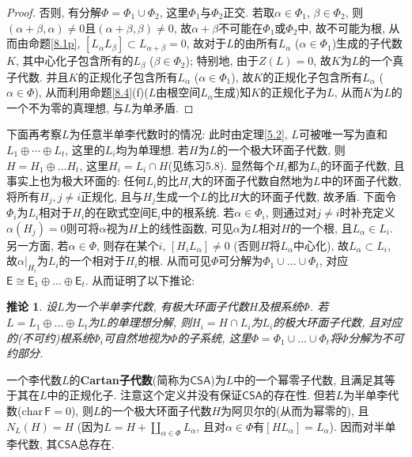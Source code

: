 \documentclass{ctexart}%
\newtheorem{corollary}{推论}
\theoremstyle{definition}
\theoremstyle{remark}
\begin{document}
\begin{proof}否则, 有分解$\Phi=\Phi_1\cup \Phi_2$, 这里$\Phi_1$与$\Phi_2$正交. 若取$\alpha\in\Phi_1$, $\beta\in\Phi_2$, 则$(\alpha+\beta,\alpha)\neq 0$且$(\alpha+\beta,\beta)\neq 0$, 故$\alpha+\beta$不可能在$\Phi_1$或$\Phi_2$中, 故不可能为根, 从而由命题\ref{8.1p}, $[L_\alpha L_\beta]\subset L_{\alpha+\beta}=0$, 故对于$L$的由所有$L_\alpha$ ($\alpha\in \Phi_1$)生成的子代数$K$, 其中心化子包含所有的$L_\beta$ ($\beta\in\Phi_2$); 特别地, 由于$Z(L)=0$, 故$K$为$L$的一个真子代数. 并且$K$的正规化子包含所有$L_\alpha$ ($\alpha\in \Phi_1$), 故$K$的正规化子包含所有$L_\alpha$ ($\alpha\in \Phi$), 从而利用命题\ref{8.4}(f)($L$由根空间$L_\alpha$生成)知$K$的正规化子为$L$, 从而$K$为$L$的一个不为零的真理想, 与$L$为单矛盾.
\end{proof}

下面再考察$L$为任意半单李代数时的情况: 此时由定理\ref{5.2}, $L$可被唯一写为直和$L_1\oplus\cdots \oplus L_t$, 这里的$L_i$均为单理想. 若$H$为$L$的一个极大环面子代数, 则$H=H_1\oplus...H_t$, 这里$H_i=L_i\cap H$(见练习5.8). 显然每个$H_i$都为$L_i$的环面子代数, 且事实上也为极大环面的: 任何$L_i$的比$H_i$大的环面子代数自然地为$L$中的环面子代数, 将所有$H_j, j\neq i$正规化, 且与$H_j$生成一个$L$的比$H$大的环面子代数, 故矛盾. 下面令$\Phi_i$为$L_i$相对于$H_i$的在欧式空间$\mathsf{E}_i$中的根系统. 若$\alpha\in \Phi_i$, 则通过对$j\neq i$时补充定义$\alpha(H_j)=0$则可将$\alpha$视为$H$上的线性函数, 可见$\alpha$为$L$相对$H$的一个根, 且$L_\alpha \in L_i$. 另一方面, 若$\alpha \in \Phi$, 则存在某个$i$, $[H_iL_\alpha]\neq 0$ (否则$H$将$L_\alpha$中心化), 故$L_\alpha\subset L_i$, 故$\alpha|_{H_i}$为$L_i$的一个相对于$H_i$的根. 从而可见$\Phi$可分解为$\Phi_1\cup...\cup \Phi_t$, 对应$\mathsf{E}\cong \mathsf{E}_1\oplus...\oplus \mathsf{E}_t$. 从而证明了以下推论:

\begin{corollary}
设$L$为一个半单李代数, 有极大环面子代数$H$及根系统$\Phi$. 若$L=L_1\oplus...\oplus L_t$为$L$的单理想分解, 则$H_i=H\cap L_i$为$L_i$的极大环面子代数, 且对应的(不可约)根系统$\Phi_i$可自然地视为$\Phi$的子系统, 这里$\Phi=\Phi_1\cup...\cup\Phi_t$将$\Phi$分解为不可约部分.
\end{corollary}

一个李代数$L$的\textbf{Cartan子代数}(简称为$\mathsf{CSA}$)为$L$中的一个幂零子代数, 且满足其等于其在$L$中的正规化子. 注意这个定义并没有保证$\mathsf{CSA}$的存在性. 但若$L$为半单李代数($\mathrm{char}\, \mathsf{F}=0$), 则$L$的一个极大环面子代数$H$为阿贝尔的(从而为幂零的), 且$N_L(H)=H$ (因为$L=H+\coprod_{\alpha\in \Phi} L_\alpha$, 且对$\alpha\in\Phi$有$[H L_\alpha]=L_\alpha$). 因而对半单李代数, 其$\mathsf{CSA}$总存在.
\end{document}
